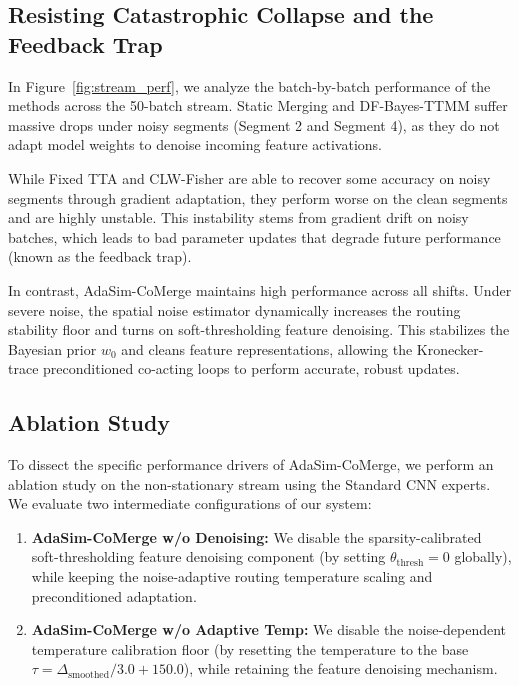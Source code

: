\documentclass{article}
\theoremstyle{plain}
\theoremstyle{definition}
\theoremstyle{remark}
\begin{document}
\subsection{Resisting Catastrophic Collapse and the Feedback Trap}
In Figure~\ref{fig:stream_perf}, we analyze the batch-by-batch performance of the methods across the 50-batch stream. Static Merging and DF-Bayes-TTMM suffer massive drops under noisy segments (Segment 2 and Segment 4), as they do not adapt model weights to denoise incoming feature activations. 

While Fixed TTA and CLW-Fisher are able to recover some accuracy on noisy segments through gradient adaptation, they perform worse on the clean segments and are highly unstable. This instability stems from gradient drift on noisy batches, which leads to bad parameter updates that degrade future performance (known as the feedback trap). 

In contrast, AdaSim-CoMerge maintains high performance across all shifts. Under severe noise, the spatial noise estimator dynamically increases the routing stability floor and turns on soft-thresholding feature denoising. This stabilizes the Bayesian prior $w_0$ and cleans feature representations, allowing the Kronecker-trace preconditioned co-acting loops to perform accurate, robust updates.

\subsection{Ablation Study}
\label{sec:ablation_study}

To dissect the specific performance drivers of AdaSim-CoMerge, we perform an ablation study on the non-stationary stream using the Standard CNN experts. We evaluate two intermediate configurations of our system:
\begin{enumerate}
    \item \textbf{AdaSim-CoMerge w/o Denoising:} We disable the sparsity-calibrated soft-thresholding feature denoising component (by setting $\theta_{\text{thresh}} = 0$ globally), while keeping the noise-adaptive routing temperature scaling and preconditioned adaptation.
    \item \textbf{AdaSim-CoMerge w/o Adaptive Temp:} We disable the noise-dependent temperature calibration floor (by resetting the temperature to the base $\tau = \Delta_{\text{smoothed}}/3.0 + 150.0$), while retaining the feature denoising mechanism.
\end{enumerate}
\end{document}
